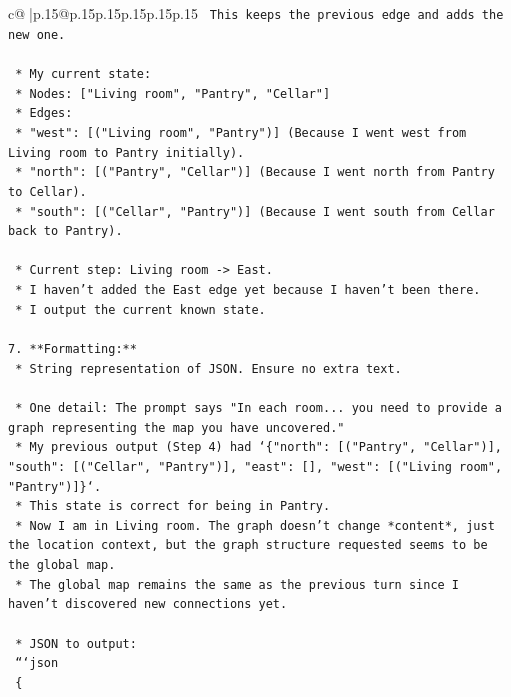 \documentclass{article}
\begin{document}
{\begin{supertabular}{c@{$\;$}|p{.15\linewidth}@{}p{.15\linewidth}p{.15\linewidth}p{.15\linewidth}p{.15\linewidth}p{.15\linewidth}}
{{{\texttt{        This keeps the previous edge and adds the new one.} \\
\\ 
\texttt{    *   My current state:} \\
\texttt{        *   Nodes: {[}"Living room", "Pantry", "Cellar"{]}} \\
\texttt{        *   Edges:} \\
\texttt{            *   "west": {[}("Living room", "Pantry"){]} (Because I went west from Living room to Pantry initially).} \\
\texttt{            *   "north": {[}("Pantry", "Cellar"){]} (Because I went north from Pantry to Cellar).} \\
\texttt{            *   "south": {[}("Cellar", "Pantry"){]} (Because I went south from Cellar back to Pantry).} \\
\\ 
\texttt{    *   Current step: Living room {-}> East.} \\
\texttt{    *   I haven't added the East edge yet because I haven't been there.} \\
\texttt{    *   I output the current known state.} \\
\\ 
\texttt{7.  **Formatting:**} \\
\texttt{    *   String representation of JSON. Ensure no extra text.} \\
\\ 
\texttt{    *   One detail: The prompt says "In each room... you need to provide a graph representing the map you have uncovered."} \\
\texttt{    *   My previous output (Step 4) had `\{"north": {[}("Pantry", "Cellar"){]}, "south": {[}("Cellar", "Pantry"){]}, "east": {[}{]}, "west": {[}("Living room", "Pantry"){]}\}`.} \\
\texttt{    *   This state is correct for being in Pantry.} \\
\texttt{    *   Now I am in Living room. The graph doesn't change *content*, just the location context, but the graph structure requested seems to be the global map.} \\
\texttt{    *   The global map remains the same as the previous turn since I haven't discovered new connections yet.} \\
\\ 
\texttt{    *   JSON to output:} \\
\texttt{    ```json} \\
\texttt{    \{} \\
}}}
\end{supertabular}}
\end{document}
